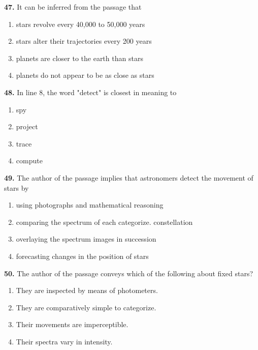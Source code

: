 \documentclass[12pt]{article}
\begin{document}
\par
\vspace{0.25\baselineskip}
\noindent\textbf{47.} It can be inferred from the passage that
\begin{enumerate}[label=(\Alph*),leftmargin=*,itemsep=0.2em]
\item stars revolve every 40,000 to 50,000 years
\item stars alter their trajectories every 200 years
\item planets are closer to the earth than stars
\item planets do not appear to be as close as stars
\end{enumerate}
\par
\vspace{0.25\baselineskip}
\noindent\textbf{48.} In line 8, the word "detect" is closest in meaning to
\begin{enumerate}[label=(\Alph*),leftmargin=*,itemsep=0.2em]
\item spy
\item project
\item trace
\item compute
\end{enumerate}
\par
\vspace{0.25\baselineskip}
\noindent\textbf{49.} The author of the passage implies that astronomers detect the movement of stars by
\begin{enumerate}[label=(\Alph*),leftmargin=*,itemsep=0.2em]
\item using photographs and mathematical reasoning
\item comparing the spectrum of each categorize. constellation
\item overlaying the spectrum images in succession
\item forecasting changes in the position of stars
\end{enumerate}
\par
\vspace{0.25\baselineskip}
\noindent\textbf{50.} The author of the passage conveys which of the following about fixed stars?
\begin{enumerate}[label=(\Alph*),leftmargin=*,itemsep=0.2em]
\item They are inspected by means of photometers.
\item They are comparatively simple to categorize.
\item Their movements are imperceptible.
\item Their spectra vary in intensity.
\end{enumerate}
\par
\vspace{0.25\baselineskip}
\end{document}
